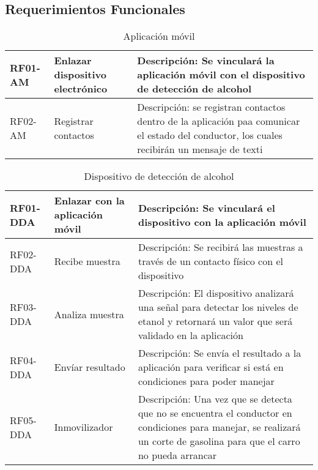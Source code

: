 \subsection{Requerimientos Funcionales} 
  
  \begin{center}
\begin{table}[!htb]
\centering
\begin{tabular}{|p{4cm}|p{4cm}|p{5cm}|}
    \hline
    RF01-AM  & Enlazar dispositivo electrónico & Descripción: Se vinculará la aplicación móvil con el dispositivo de detección de alcohol \\ \hline
    RF02-AM & Registrar contactos & Descripción: se registran contactos dentro de la aplicación paa comunicar el estado del conductor, los cuales recibirán un mensaje de texti \\ 
    \hline
\end{tabular}
\caption{Aplicación móvil}
\label{tab:rf_am}
\end{table}
\end{center}

\begin{center}
\begin{table}[!htb]
\centering
\begin{tabular}{|p{4cm}|p{4cm}|p{5cm}|}
    \hline
    RF01-DDA & Enlazar con la aplicación móvil & Descripción: Se vinculará el dispositivo con la aplicación móvil \\ \hline
    RF02-DDA & Recibe muestra & Descripción: Se recibirá las muestras a través de un contacto físico con el dispositivo \\ \hline
    RF03-DDA & Analiza muestra & Descripción: El dispositivo analizará una señal para detectar los niveles de etanol y retornará un valor que será validado en la aplicación \\ \hline
    RF04-DDA & Envíar resultado & Descripción: Se envía el resultado a la aplicación para verificar si está en condiciones para poder manejar \\ \hline
    RF05-DDA & Inmovilizador & Descripción: Una vez que se detecta que no se encuentra el conductor en condiciones para manejar, se realizará
  un corte de gasolina para que el carro no pueda arrancar \\
    \hline
\end{tabular}
\caption{Dispositivo de detección de alcohol}
\label{tabla:rf_dda}
\end{table}
\end{center}
